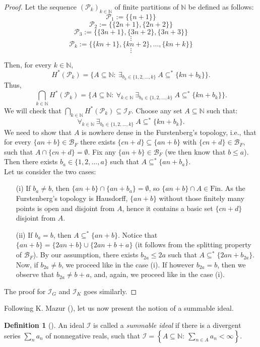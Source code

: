 \documentclass{amsart}
\theoremstyle{definition}
\newtheorem{df}[thm]{Definition}
\newcommand{\N}{{\mathbb N}}
\newcommand{\Fin}{\textrm{Fin}}
\newcommand{\I}{\mathcal I}
\newcommand{\B}{\mathcal{B}}
\begin{document}
\begin{proof}
Let the sequence $(\mathcal{P}_k)_{k\in\N}$ of finite partitions of $\N$ be defined as follows:
$$\mathcal{P}_1 := \{\{n+1\}\}$$
$$\mathcal{P}_2 := \{\{2n+1\}, \{2n+2\}\}$$
$$\mathcal{P}_3 := \{\{3n+1\}, \{3n+2\}, \{3n+3\}\}$$
$$\vdots$$
$$\mathcal{P}_k := \{\{kn+1\}, \{kn+2\}, \ldots, \{kn+k\}\}$$
$$\vdots$$

Then, for every $k\in\N$, 
$$H^{*}(\mathcal{P}_k)= \{A\subseteq\N :\ \exists_{b_k\in\{1,2,\ldots,k\}}\ A\subseteq^* \{kn+b_k\}\}.$$
Thus,
$$\bigcap_{k\in\N}{H^{*}(\mathcal{P}_k)}= \{A\subseteq\N :\ \forall_{k\in\N}\ \exists_{b_k\in\{1,2,\ldots,k\}}\ A\subseteq^* \{kn+b_k\}\}.$$
We will check that $\bigcap_{k\in\N}{H^{*}(\mathcal{P}_k)}\subseteq\I_F$. Choose any set $A\subseteq\N$ such that: 
$$\forall_{k\in\N}\ \exists_{b_k\in\{1,2,\ldots,k\}}\ A\subseteq^* \{kn+b_k\}.$$ 
We need to show that $A$ is nowhere dense in the Furstenberg's topology, i.e., that for every $\{an+b\}\in \B_F$ there exists $\{cn+d\}\subseteq \{an+b\}$ with $\{cn+d\}\in \B_F$, such that $A\cap \{cn+d\} = \emptyset$. Fix any $\{an+b\}\in \B_F$ (we then know that $b\leq a$). Then there exists $b_a\in\{1,2,\ldots,a\}$ such that $A\subseteq^* \{an+b_a\}$.\\ 
Let us consider the two cases:
\begin{itemize}
	\item[(i)] If $b_a\neq b$, then $\{an+b\} \cap \{an+b_a\} = \emptyset$, so $\{an+b\}\cap A \in\Fin$. 
	As the Furstenberg's topology is Hausdorff, $\{an+b\}$ without those finitely many points is open and disjoint from $A$, hence it contains a basic set $\{cn+d\}$ disjoint from $A$. 
	\item[(ii)] If $b_a = b$, then $A\subseteq^* \{an+b\}$. Notice that $\{an+b\}=\{2an+b\}\cup \{2an+b+a\}$ (it follows from the splitting property of $\B_F$). By our assumption, there exists $b_{2a}\leq 2a$ such that $A\subseteq^* \{2an+b_{2a}\}$. Now, if $b_{2a} \neq b$, we proceed like in the case (i). If however $b_{2a}=b$, then we observe that $b_{2a}\neq b+a$, and, again, we proceed like in the case (i).
\end{itemize}

The proof for $\I_G$ and $\I_K$ goes similarly.
\end{proof}


Following K. Mazur (\cite{Maz}), let us now present the notion of a summable ideal.

\begin{df}[\cite{Maz}]
An ideal $\I$ is called a \emph{summable ideal} if there is a divergent series $\sum_{n}{a_n}$ of nonnegative reals, such that $\I=\left\{A\subseteq \N :\ \sum_{n\in A}{a_n} <\infty\right\}$.
\end{df}
\end{document}
